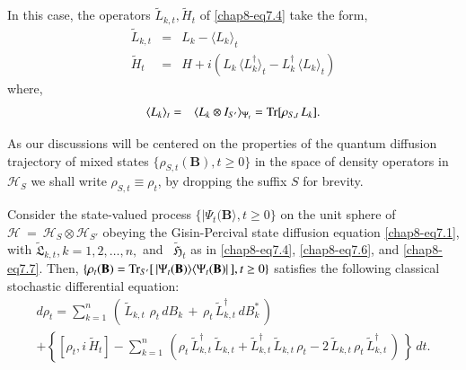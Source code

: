 In this case, the operators $\widetilde{L}_{k,t}, \widetilde{H}_t$ of \eqref{chap8-eq7.4} take the form,     
\begin{eqnarray}
\widetilde{L}_{k,t} &=&  L_k -\langle  L_k\rangle_{t}  \nonumber \\                    
\widetilde{H}_t&=& H  +i\left(L_k\, \langle L^\dag_k\rangle_{t}-L^\dag_k\, \langle L_k\rangle_{t} \right) \label{chap8-eq7.6}
\end{eqnarray}
where, 
\begin{eqnarray}
\langle  L_k\rangle_{t}&=&\langle L_k\otimes I_{S'} \rangle_{\Psi_t} = {\rm Tr}[\rho_{S,t}\, L_k].  \label{chap8-eq7.7}
\end{eqnarray} 

As our discussions will be centered on the properties of the quantum diffusion trajectory of  mixed states  $\{\rho_{S,t}(\mathbf{B}), t\geq 0\}$ in the space of density operators in $\mathcal{H}_S$  we shall write  $\rho_{S,t}\equiv \rho_{t}$, by dropping the suffix $S$ for brevity. 

\begin{prop*}
Consider the state-valued  process $\{\vert\Psi_t(\mathbf{B}\rangle, t\geq 0\}$ on the unit sphere of $\mathcal{H}~=~\mathcal{H}_S\otimes \mathcal{H}_{S'}$ obeying  the  Gisin-Percival state diffusion equation \eqref{chap8-eq7.1}, with $\widetilde{\mathfrak{L}}_{k,t}, k=1,2,\ldots, n,$ and \ $\widetilde{\mathfrak{H}}_t$ as in \eqref{chap8-eq7.4}, \eqref{chap8-eq7.6}, and \eqref{chap8-eq7.7}. Then, $\{\rho_t(\mathbf{B})={\rm Tr}_{S'}[\,\vert 
\Psi_t(\mathbf{B})\rangle\langle\Psi_t(\mathbf{B})\vert\,], t\geq 0\}$ satisfies the following classical stochastic differential equation:
\begin{multline}
d\rho_t = \sum_{k=1}^{n}\,\left(\,\widetilde{L}_{k,t}\,\, \rho_t\, dB_{k}\, + \, \rho_t\,\widetilde{L}^\dag_{k,t}\, dB^*_{k}\,\right)  \\ 
 +  \left\{ \left[\rho_t, i\, \widetilde{H}_{t}\right] - \sum_{k=1}^{n}\, \left( \rho_t\, \widetilde{L}^\dag_{k,t}\, \widetilde{L}_{k,t} + \widetilde{L}^{\dag}_{k,t}\, \widetilde{L}_{k,t}\, \rho_t - 2\, \widetilde{L}_{k,t}\, \rho_t\,\widetilde{L}^\dag_{k,t}\,\right)\,\right\}\, dt.  \label{chap8-eq7.8}
\end{multline}
\end{prop*}

